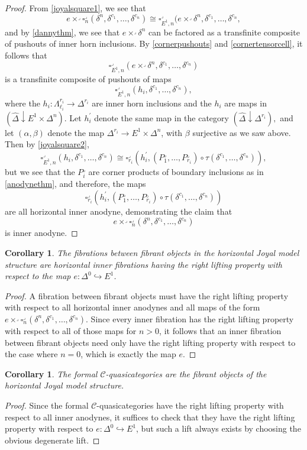 \documentclass{amsart}
\numberwithin{equation}{section}
\theoremstyle{plain}   %
\newtheorem{cor}[subsection]{Corollary}
\theoremstyle{remark}
\theoremstyle{plain}
\newcommand{\overcat}[2]{{\left(#1\downarrow #2\right)}}
\newcommand{\psh}[1]{\ensuremath{\widehat{#1}}}
\newcommand{\C}{\ensuremath{\mathcal{C}}}
\begin{document}
\begin{proof}
	From \ref{joyalsquare1}, we see that 
	\[e \times^\lrcorner \square^\lrcorner_n(\delta^n,\delta^{c_1},\dots,\delta^{c_n}) \cong \square^\lrcorner_{E^1,n}(e\times^\lrcorner \delta^n, \delta^{c_1},\dots,\delta^{c_n},\]
	and by \ref{dannythm}, we see that \(e\times^\lrcorner \delta^n\) can be factored as a transfinite composite of pushouts of inner horn inclusions.  By \ref{cornerpushouts} and \ref{cornertensorcell}, it follows that 
	\[\square^\lrcorner_{E^1,n}(e\times^\lrcorner \delta^n, \delta^{c_1},\dots,\delta^{c_n})\]
	is a transfinite composite of pushouts of maps
	\[\square^\lrcorner_{E^1,n}(h_i, \delta^{c_1},\dots,\delta^{c_n}),\]
	where the \(h_i:\Lambda^{r_i}_{\ell_i}\to \Delta^{r_i}\) are inner horn inclusions and the \(h_i\) are maps in \(\overcat{\psh{\Delta}}{E^1 \times \Delta^n}\).  Let \(h^\prime_i\) denote the same map in the category \(\overcat{\psh{\Delta}}{\Delta^{r_i}},\) and let \((\alpha,\beta)\) denote the map \(\Delta^{r_i} \to E^1 \times \Delta^n\), with \(\beta\) surjective as we saw above.  Then by \ref{joyalsquare2}, 
	\[\square_{E^1,n}^\lrcorner(h_i, \delta^{c_1},\dots,\delta^{c_n}) \cong \square^\lrcorner_{r_i}(h^\prime_i,(P_1^\lrcorner,\dots, P_{r_i}^\lrcorner) \circ \tau(\delta^{c_1},\dots,\delta^{c_n})),\]
	but we see that the \(P^\lrcorner_i\) are corner products of boundary inclusions as in \ref{anodynethm}, and therefore, the maps
	\[\square^\lrcorner_{r_i}(h^\prime_i,(P_1^\lrcorner,\dots, P_{r_i}^\lrcorner) \circ \tau(\delta^{c_1},\dots,\delta^{c_n}))\] 
	are all horizontal inner anodyne, demonstrating the claim that
	\[e \times^\lrcorner \square_n^\lrcorner(\delta^n,\delta^{c_1},\dots,\delta^{c_n})\]
	is inner anodyne.
\end{proof}

\begin{cor}
	The fibrations between fibrant objects in the horizontal Joyal model structure are horizontal inner fibrations having the right lifting property with respect to the map \(e:\Delta^0\hookrightarrow E^1\).
\end{cor}
\begin{proof} 
	A fibration between fibrant objects must have the right lifting property with respect to all horizontal inner anodynes and all maps of the form \(e\times^\lrcorner  \square_n^\lrcorner(\delta^n,\delta^{c_1},\dots,\delta^{c_n})\).  Since every inner fibration has the right lifting property with respect to all of those maps for \(n>0\), it follows that an inner fibration between fibrant objects need only have the right lifting property with respect to the case where \(n=0\), which is exactly the map \(e\).
\end{proof}
\begin{cor}
	The formal \(\C\)-quasicategories are the fibrant objects of the horizontal Joyal model structure.
\end{cor}
\begin{proof}
	Since the formal \(\C\)-quasicategories have the right lifting property with respect to all inner anodynes, it suffices to check that they have the right lifting property with respect to \(e:\Delta^0\hookrightarrow E^1\), but such a lift always exists by choosing the obvious degenerate lift.
\end{proof}
\end{document}

